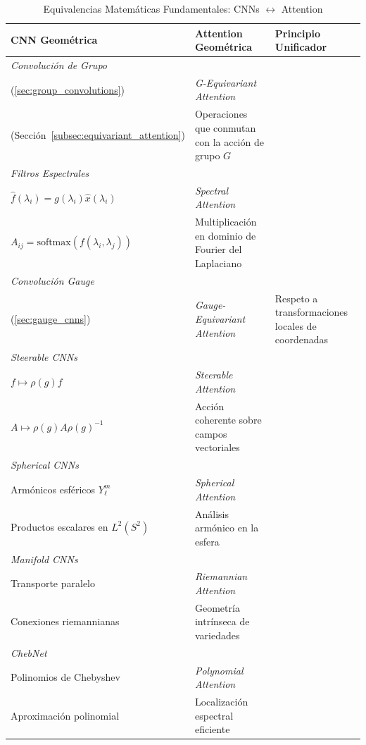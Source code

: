 \begin{table}[H]
\centering
\caption{Equivalencias Matemáticas Fundamentales: CNNs $\leftrightarrow$ Attention}
\label{tab:cnn_attention_equivalencias_fundamentales}
\begin{tabular}{|p{}|p{}|p{}|}
\hline
\textbf{CNN Geométrica} & \textbf{Attention Geométrica} & \textbf{Principio Unificador} \\
\hline\hline
\textit{Convolución de Grupo} \\
(\autoref{sec:group_convolutions}) & \textit{G-Equivariant Attention} \\
(Sección~\ref{subsec:equivariant_attention}) & Operaciones que conmutan con la acción de grupo $G$ \\
\hline
\textit{Filtros Espectrales} \\
$\hat{f}(\lambda_i) = g(\lambda_i) \hat{x}(\lambda_i)$ & \textit{Spectral Attention} \\
$A_{ij} = \text{softmax}(f(\lambda_i, \lambda_j))$ & Multiplicación en dominio de Fourier del Laplaciano \\
\hline
\textit{Convolución Gauge} \\
(\autoref{sec:gauge_cnns}) & \textit{Gauge-Equivariant Attention} & Respeto a transformaciones locales de coordenadas \\
\hline
\textit{Steerable CNNs} \\
$f \mapsto \rho(g) f$ & \textit{Steerable Attention} \\
$A \mapsto \rho(g) A \rho(g)^{-1}$ & Acción coherente sobre campos vectoriales \\
\hline
\textit{Spherical CNNs} \\
Armónicos esféricos $Y_\ell^m$ & \textit{Spherical Attention} \\
Productos escalares en $L^2(S^2)$ & Análisis armónico en la esfera \\
\hline
\textit{Manifold CNNs} \\
Transporte paralelo & \textit{Riemannian Attention} \\
Conexiones riemannianas & Geometría intrínseca de variedades \\
\hline
\textit{ChebNet} \\
Polinomios de Chebyshev & \textit{Polynomial Attention} \\
Aproximación polinomial & Localización espectral eficiente \\
\hline
\end{tabular}
\end{table}

